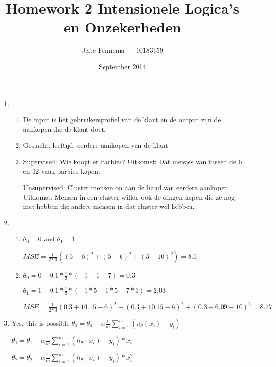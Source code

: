 \documentclass{article}
\title{Homework 2 Intensionele Logica's en Onzekerheden}
\author{Jelte Fennema --- 10183159}
\date{September 2014}
\begin{document}
\maketitle
\begin{enumerate}
    \item
        \begin{enumerate}
            \item
                De input is het gebruikersprofiel van de klant en de output zijn
                de aankopen die de klant doet.
            \item
                Geslacht, leeftijd, eerdere aankopen van de klant
            \item
                Supervised: Wie koopt er barbies? Uitkomst: Dat meisjes van
                tussen de 6 en 12 vaak barbies kopen.

                Unsupervised: Cluster mensen op aan de hand van eerdere
                aankopen. Uitkomst: Mensen in een cluster willen ook de dingen
                kopen die ze nog niet hebben die andere mensen in dat cluster
                wel hebben.

        \end{enumerate}

    \item
        \begin{enumerate}
            \item $\theta_0 = 0$ and $\theta_1 = 1$

                $MSE = \frac{1}{2 * 3}({(5 - 6)}^2 + {(5 - 6)}^2 + {(3 - 10)}^2) = 8.5$
            \item
                $\theta_0 = 0 - 0.1 * \frac{1}{3} * (-1 - 1 - 7) = 0.3$

                $\theta_1 = 1 - 0.1 * \frac{1}{3} * (-1*5 - 1*5 - 7*3) = 2.03$

                $MSE = \frac{1}{2 * 3}{(0.3 + 10.15 - 6)}^2 + {(0.3 + 10.15 - 6)}^2 + {(0.3 + 6.09 - 10)}^2 = 8.77$
        \end{enumerate}

    \item Yes, this is possible
        $\theta_0 = \theta_0 - \alpha\frac{1}{m} \sum\limits_{i=1}^m(h_\theta(x_i) - y_i)$

        $\theta_1 = \theta_1 - \alpha\frac{1}{m}
        \sum\limits_{i=1}^m(h_\theta(x_i) - y_i) * x_i$

        $\theta_2 = \theta_2 - \alpha\frac{1}{m}
        \sum\limits_{i=1}^m(h_\theta(x_i) - y_i) * x_i^2$


\end{enumerate}
\end{document}
